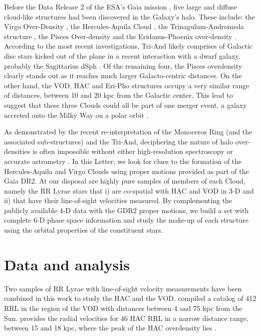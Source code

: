 \documentclass[fleqn,usenatbib]{mnras}
\begin{document}
Before the Data Release 2 \citep[][]{Brown2018} of the ESA's Gaia
mission \citep[][]{Prusti2016}, five large and diffuse cloud-like
structures had been discovered in the Galaxy's halo. These include:
the Virgo Over-Density
\citep[VOD,][]{Vivas2001,Newberg2002,Duffau2006,Juric2008,Bonaca2012},
the Hercules-Aquila Cloud \citep[HAC,][]{Be07,Simion2014}, the
Trinagulum-Andromeda structure
\citep[Tri-And,][]{Rocha2004,Majewski2004,Deason2014}, the Pisces
Over-density \citep[][]{Sesar2007,Wa09,Nie2015} and the
Eridanus-Phoenix over-density \citep[Eri-Pho,][]{Li2016}. According to
the most recent investigations, Tri-And likely comprises of Galactic
disc stars kicked out of the plane in a recent interaction with a
dwarf galaxy, probably the Sagittarius dSph
\citep[e.g.][]{Pr15,Bergemann2018,Hayes2018}. Of the remaining four,
the Pisces overdensity clearly stands out as it reaches much larger
Galacto-centric distances. On the other hand, the VOD, HAC and Eri-Pho
structures occupy a very similar range of distances, between 10 and 20
kpc from the Galactic center. This lead \citet{Li2016} to suggest that
these three Clouds could all be part of one merger event, a galaxy
accreted onto the Milky Way on a polar orbit \citep[see
  also][]{Juric2008}.

As demonstrated by the recent re-interpretation of the Monoceros Ring
(and the associated sub-structures) and the Tri-And, deciphering the
nature of halo over-densities is often impossible without either
high-resolution spectroscopy \citep[e.g.][]{Bergemann2018} or accurate
astrometry \citep[e.g.][]{deBoer2018,Deason2018}. In this Letter, we
look for clues to the formation of the Hercules-Aquila and Virgo
Clouds using proper motions provided as part of the Gaia DR2. At our
disposal are highly pure samples of members of each Cloud, namely the
RR Lyrae stars that i) are co-spatial with HAC and VOD in 3-D and ii)
that have their line-of-sight velocities measured. By complementing
the publicly available 4-D data with the GDR2 proper motions, we build
a set with complete 6-D phase space information and study the make-up
of each structure using the orbital properties of the constituent
stars.

\section{Data and analysis}
Two samples of RR Lyrae with line-of-sight velocity measurements have been combined in this work to study the HAC and the VOD. \cite{Vivas2016} compiled a catalog of 412 RRL in the region of the VOD with distances between 4 and 75 kpc from the Sun. \cite{Simion2018} provides the radial velocities for 46 HAC RRL in a narrow distance range, between 15 and 18 kpc, where the peak of the HAC overdensity lies \citet{Simion2014}. 
%
\end{document}
